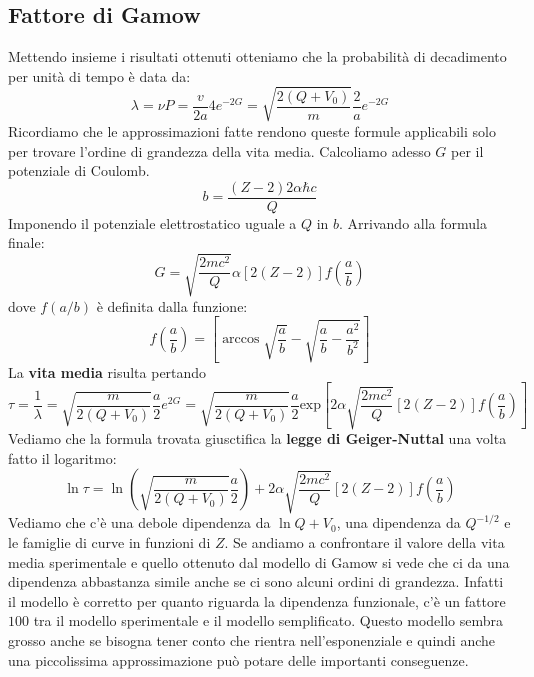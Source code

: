 \subsection{Fattore di Gamow}
Mettendo insieme i risultati ottenuti otteniamo che la probabilità di decadimento per unità di tempo è data da:
\begin{equation*}
    \lambda=\nu P=\frac{v}{2a}4e^{-2G}=\sqrt{\frac{2(Q+V_0)}{m}}\frac{2}{a}e^{-2G}
\end{equation*}
Ricordiamo che le approssimazioni fatte rendono queste formule applicabili solo per trovare l'ordine di grandezza della vita media. Calcoliamo adesso $G$ per il potenziale di Coulomb.
\begin{equation*}
    b=\frac{(Z-2)2\alpha\hbar c}{Q}
\end{equation*}
Imponendo il potenziale elettrostatico uguale a $Q$ in $b$. Arrivando alla formula finale:
\begin{equation*}
    G=\sqrt{\frac{2mc^2}{Q}}\alpha[2(Z-2)]f\left(\frac{a}{b}\right)
\end{equation*}
dove $f(a/b)$ è definita dalla funzione:
\begin{equation*}
    f\left(\frac{a}{b}\right)=\left[\arccos{\sqrt{\frac{a}{b}}}-\sqrt{\frac{a}{b}-\frac{a^2}{b^2}}\right]
\end{equation*}
La \textbf{vita media} risulta pertando
\begin{equation*}
    \tau=\frac{1}{\lambda}=\sqrt{\frac{m}{2(Q+V_0)}}\frac{a}{2}e^{2G}=\sqrt{\frac{m}{2(Q+V_0)}}\frac{a}{2}\text{exp}\left[ 2\alpha\sqrt{\frac{2mc^2}{Q}}[2(Z-2)] f\left(\frac{a}{b}\right)\right]
\end{equation*}
Vediamo che la formula trovata giusctifica la \textbf{legge di Geiger-Nuttal} una volta fatto il logaritmo:
\begin{equation*}
    \ln{\tau}=\ln{\left( \sqrt{\frac{m}{2(Q+V_0)}}\frac{a}{2} \right)}+2\alpha\sqrt{\frac{2mc^2}{Q}}[2(Z-2)] f\left(\frac{a}{b}\right)
\end{equation*}
Vediamo che c'è una debole dipendenza da $\ln{Q+V_0}$, una dipendenza da $Q^{-1/2}$ e le famiglie di curve in funzioni di $Z$. Se andiamo a confrontare il valore della vita media sperimentale e quello ottenuto dal modello di Gamow si vede che ci da una dipendenza abbastanza simile anche se ci sono alcuni ordini di grandezza. Infatti il modello è corretto per quanto riguarda la dipendenza funzionale, c'è un fattore $100$ tra il modello sperimentale e il modello semplificato. Questo modello sembra grosso anche se bisogna tener conto che rientra nell'esponenziale e quindi anche una piccolissima approssimazione può potare delle importanti conseguenze.

